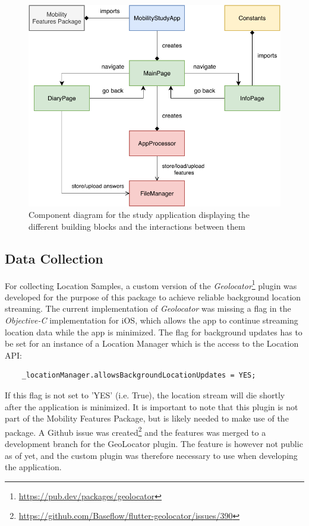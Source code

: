 \begin{figure}
    \centering
    \includegraphics[width=\textwidth]{images/diagrams/app-diagram.pdf}
    \caption{Component diagram for the study application displaying the different building blocks and the interactions between them}
    \label{fig:app-component-diagram}
\end{figure}

\subsection{Data Collection}
For collecting Location Samples, a custom version of the \textit{Geolocator}\footnote{\url{https://pub.dev/packages/geolocator}} plugin was developed for the purpose of this package to achieve reliable background location streaming. The current implementation of \textit{Geolocator} was missing a flag in the \textit{Objective-C} implementation for iOS, which allows the app to continue streaming location data while the app is minimized. The flag for background updates has to be set for an instance of a Location Manager which is the access to the Location API:

\begin{verbatim}
    _locationManager.allowsBackgroundLocationUpdates = YES;
\end{verbatim}

If this flag is not set to 'YES' (i.e. True), the location stream will die shortly after the application is minimized. It is important to note that this plugin is not part of the Mobility Features Package, but is likely needed to make use of the package. A Github issue was created\footnote{\url{https://github.com/Baseflow/flutter-geolocator/issues/390}} and the features was merged to a development branch for the GeoLocator plugin. The feature is however not public as of yet, and the custom plugin was therefore necessary to use when developing the application. 



